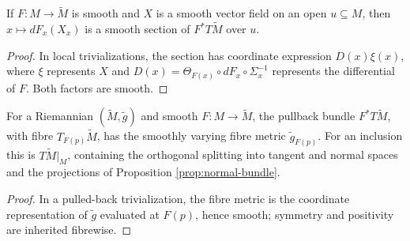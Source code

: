 \begin{lemma}
\label{lem:pushforward-smooth}
\leanok
{}
If $F:M\to\widetilde M$ is smooth and $X$ is a smooth vector field on an open $u\subseteq M$, then $x\mapsto dF_x(X_x)$ is a smooth section of $F^*T\widetilde M$ over $u$.
\end{lemma}
\begin{proof}
\leanok
\sketch In local trivializations, the section has coordinate expression $D(x)\xi(x)$, where $\xi$ represents $X$ and $D(x)=\Theta_{F(x)}\circ dF_x\circ\Sigma_x^{-1}$ represents the differential of $F$. Both factors are smooth.
\end{proof}

\begin{lemma}
\label{lem:ambient-tangent-bundle-riemannian}
\leanok
{}
For a Riemannian $(\widetilde M,\widetilde g)$ and smooth $F:M\to\widetilde M$, the pullback bundle $F^*T\widetilde M$, with fibre $T_{F(p)}\widetilde M$, has the smoothly varying fibre metric $\widetilde g_{F(p)}$. For an inclusion this is $T\widetilde M|_M$, containing the orthogonal splitting into tangent and normal spaces and the projections of Proposition \ref{prop:normal-bundle}.
\end{lemma}
\begin{proof}
\leanok
{}
\sketch In a pulled-back trivialization, the fibre metric is the coordinate representation of $\widetilde g$ evaluated at $F(p)$, hence smooth; symmetry and positivity are inherited fibrewise.
\end{proof}

